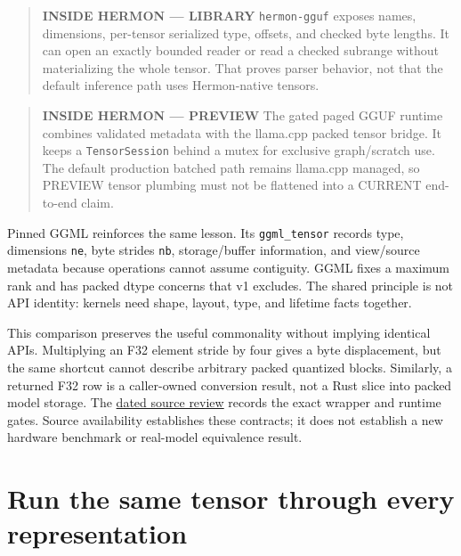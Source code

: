 \begin{quote}
\textbf{INSIDE HERMON --- LIBRARY} \texttt{hermon-gguf} exposes names,
dimensions, per-tensor serialized type, offsets, and checked byte
lengths. It can open an exactly bounded reader or read a checked
subrange without materializing the whole tensor. That proves parser
behavior, not that the default inference path uses Hermon-native
tensors.
\end{quote}

\begin{quote}
\textbf{INSIDE HERMON --- PREVIEW} The gated paged GGUF runtime combines
validated metadata with the llama.cpp packed tensor bridge. It keeps a
\texttt{TensorSession} behind a mutex for exclusive graph/scratch use.
The default production batched path remains llama.cpp managed, so
PREVIEW tensor plumbing must not be flattened into a CURRENT end-to-end
claim.
\end{quote}

Pinned GGML reinforces the same lesson. Its \texttt{ggml\_tensor}
records type, dimensions \texttt{ne}, byte strides \texttt{nb},
storage/buffer information, and view/source metadata because operations
cannot assume contiguity. GGML fixes a maximum rank and has packed dtype
concerns that v1 excludes. The shared principle is not API identity:
kernels need shape, layout, type, and lifetime facts together.


This comparison preserves the useful commonality without implying
identical APIs. Multiplying an F32 element stride by four gives a byte
displacement, but the same shortcut cannot describe arbitrary packed
quantized blocks. Similarly, a returned F32 row is a caller-owned
conversion result, not a Rust slice into packed model storage. The
\href{https://github.com/hermonai/inside-the-llm-engine/blob/astra-visual-rewrite/research/astra/chapter05-regeneration.md}{dated
source review} records the exact wrapper and runtime gates. Source
availability establishes these contracts; it does not establish a new
hardware benchmark or real-model equivalence result.

\section{Run the same tensor through every
representation}\label{run-the-same-tensor-through-every-representation}

